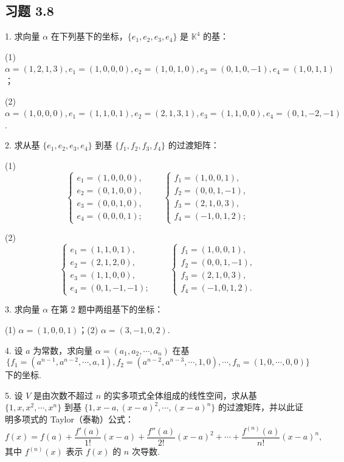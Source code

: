 \documentclass[UTF8,12pt,a4paper,fontset=fandol]{ctexart}
\begin{document}
\subsection*{习题 3.8}

1. 求向量 $\alpha$ 在下列基下的坐标，$\{e_1,e_2,e_3,e_4\}$ 是 $\mathbb{K}^4$ 的基：

(1) $\alpha=(1,2,1,3),e_1=(1,0,0,0),e_2=(1,0,1,0),e_3=(0,1,0,-1),e_4=(1,0,1,1)$；

(2) $\alpha=(1,0,0,0),e_1=(1,1,0,1),e_2=(2,1,3,1),e_3=(1,1,0,0),e_4=(0,1,-2,-1)$.

2. 求从基 $\{e_1,e_2,e_3,e_4\}$ 到基 $\{f_1,f_2,f_3,f_4\}$ 的过渡矩阵：

(1)
\[
\left\{\begin{array}{l}
e_1=(1,0,0,0),\\
e_2=(0,1,0,0),\\
e_3=(0,0,1,0),\\
e_4=(0,0,0,1);
\end{array}\right.
\qquad
\left\{\begin{array}{l}
f_1=(1,0,0,1),\\
f_2=(0,0,1,-1),\\
f_3=(2,1,0,3),\\
f_4=(-1,0,1,2);
\end{array}\right.
\]

(2)
\[
\left\{\begin{array}{l}
e_1=(1,1,0,1),\\
e_2=(2,1,2,0),\\
e_3=(1,1,0,0),\\
e_4=(0,1,-1,-1);
\end{array}\right.
\qquad
\left\{\begin{array}{l}
f_1=(1,0,0,1),\\
f_2=(0,0,1,-1),\\
f_3=(2,1,0,3),\\
f_4=(-1,0,1,2).
\end{array}\right.
\]

3. 求向量 $\alpha$ 在第 2 题中两组基下的坐标：

(1) $\alpha=(1,0,0,1)$；\qquad (2) $\alpha=(3,-1,0,2)$.

4. 设 $a$ 为常数，求向量 $\alpha=(a_1,a_2,\cdots,a_n)$ 在基
\[
\{f_1=(a^{n-1},a^{n-2},\cdots,a,1),f_2=(a^{n-2},a^{n-3},\cdots,1,0),\cdots,f_n=(1,0,\cdots,0,0)\}
\]
下的坐标.

5. 设 $V$ 是由次数不超过 $n$ 的实多项式全体组成的线性空间，求从基 $\{1,x,x^2,\cdots,x^n\}$ 到基 $\{1,x-a,(x-a)^2,\cdots,(x-a)^n\}$ 的过渡矩阵，并以此证明多项式的 Taylor（泰勒）公式：
\[
f(x)=f(a)+\frac{f'(a)}{1!}(x-a)+\frac{f''(a)}{2!}(x-a)^2+\cdots+\frac{f^{(n)}(a)}{n!}(x-a)^n,
\]
其中 $f^{(n)}(x)$ 表示 $f(x)$ 的 $n$ 次导数.
\end{document}

